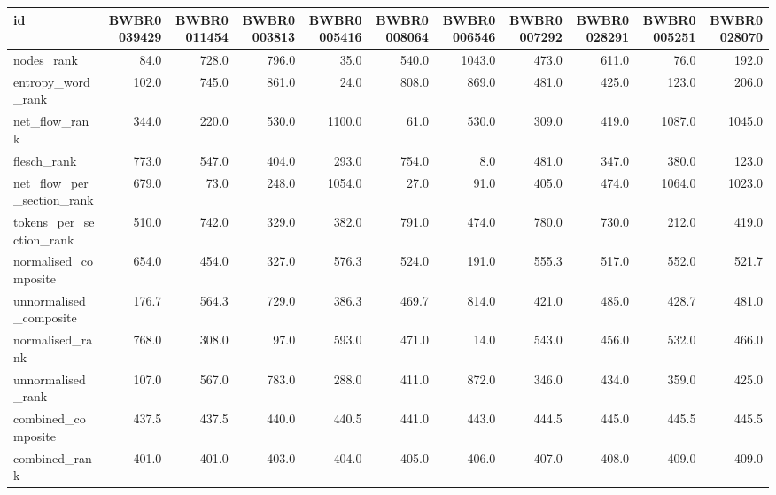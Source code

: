 \begin{tabular}{lrrrrrrrrrr}
\toprule
id & BWBR0039429 & BWBR0011454 & BWBR0003813 & BWBR0005416 & BWBR0008064 & BWBR0006546 & BWBR0007292 & BWBR0028291 & BWBR0005251 & BWBR0028070 \\
\midrule
nodes\_rank & 84.0 & 728.0 & 796.0 & 35.0 & 540.0 & 1043.0 & 473.0 & 611.0 & 76.0 & 192.0 \\
\cline{1-11}
entropy\_word\_rank & 102.0 & 745.0 & 861.0 & 24.0 & 808.0 & 869.0 & 481.0 & 425.0 & 123.0 & 206.0 \\
\cline{1-11}
net\_flow\_rank & 344.0 & 220.0 & 530.0 & 1100.0 & 61.0 & 530.0 & 309.0 & 419.0 & 1087.0 & 1045.0 \\
\cline{1-11}
flesch\_rank & 773.0 & 547.0 & 404.0 & 293.0 & 754.0 & 8.0 & 481.0 & 347.0 & 380.0 & 123.0 \\
\cline{1-11}
net\_flow\_per\_section\_rank & 679.0 & 73.0 & 248.0 & 1054.0 & 27.0 & 91.0 & 405.0 & 474.0 & 1064.0 & 1023.0 \\
\cline{1-11}
tokens\_per\_section\_rank & 510.0 & 742.0 & 329.0 & 382.0 & 791.0 & 474.0 & 780.0 & 730.0 & 212.0 & 419.0 \\
\cline{1-11}
normalised\_composite & 654.0 & 454.0 & 327.0 & 576.3 & 524.0 & 191.0 & 555.3 & 517.0 & 552.0 & 521.7 \\
\cline{1-11}
unnormalised\_composite & 176.7 & 564.3 & 729.0 & 386.3 & 469.7 & 814.0 & 421.0 & 485.0 & 428.7 & 481.0 \\
\cline{1-11}
normalised\_rank & 768.0 & 308.0 & 97.0 & 593.0 & 471.0 & 14.0 & 543.0 & 456.0 & 532.0 & 466.0 \\
\cline{1-11}
unnormalised\_rank & 107.0 & 567.0 & 783.0 & 288.0 & 411.0 & 872.0 & 346.0 & 434.0 & 359.0 & 425.0 \\
\cline{1-11}
combined\_composite & 437.5 & 437.5 & 440.0 & 440.5 & 441.0 & 443.0 & 444.5 & 445.0 & 445.5 & 445.5 \\
\cline{1-11}
combined\_rank & 401.0 & 401.0 & 403.0 & 404.0 & 405.0 & 406.0 & 407.0 & 408.0 & 409.0 & 409.0 \\
\cline{1-11}
\bottomrule
\end{tabular}
